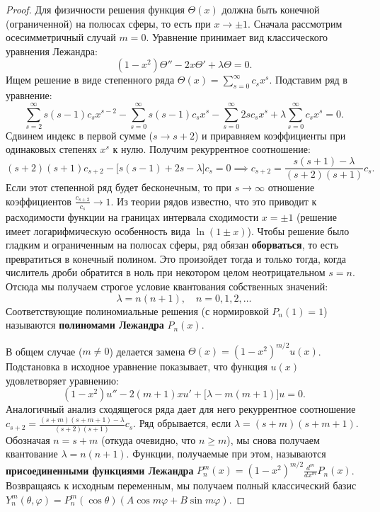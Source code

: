 \documentclass[a4paper,10pt]{article}
\begin{document}
\begin{proof}
Для физичности решения функция $\Theta(x)$ должна быть конечной (ограниченной) на полюсах сферы, то есть при $x \to \pm 1$. Сначала рассмотрим осесимметричный случай $m=0$. Уравнение принимает вид классического уравнения Лежандра:
\[ (1-x^2) \Theta'' - 2x \Theta' + \lambda \Theta = 0. \]
Ищем решение в виде степенного ряда $\Theta(x) = \sum_{s=0}^\infty c_s x^s$. Подставим ряд в уравнение:
\[ \sum_{s=2}^\infty s(s-1)c_s x^{s-2} - \sum_{s=0}^\infty s(s-1)c_s x^s - \sum_{s=0}^\infty 2s c_s x^s + \lambda \sum_{s=0}^\infty c_s x^s = 0. \]
Сдвинем индекс в первой сумме ($s \to s+2$) и приравняем коэффициенты при одинаковых степенях $x^s$ к нулю. Получим рекуррентное соотношение:
\[ (s+2)(s+1)c_{s+2} - \big[s(s-1) + 2s - \lambda\big]c_s = 0 \implies c_{s+2} = \frac{s(s+1) - \lambda}{(s+2)(s+1)} c_s. \]
Если этот степенной ряд будет бесконечным, то при $s \to \infty$ отношение коэффициентов $\frac{c_{s+2}}{c_s} \to 1$. Из теории рядов известно, что это приводит к расходимости функции на границах интервала сходимости $x = \pm 1$ (решение имеет логарифмическую особенность вида $\ln(1 \pm x)$). 
Чтобы решение было гладким и ограниченным на полюсах сферы, ряд обязан \textbf{оборваться}, то есть превратиться в конечный полином. Это произойдет тогда и только тогда, когда числитель дроби обратится в ноль при некотором целом неотрицательном $s = n$. Отсюда мы получаем строгое условие квантования собственных значений:
\[ \lambda = n(n+1), \quad n = 0, 1, 2, \dots \]
Соответствующие полиномиальные решения (с нормировкой $P_n(1)=1$) называются \textbf{полиномами Лежандра} $P_n(x)$.

В общем случае ($m \neq 0$) делается замена $\Theta(x) = (1-x^2)^{m/2} u(x)$. Подстановка в исходное уравнение показывает, что функция $u(x)$ удовлетворяет уравнению:
\[ (1-x^2)u'' - 2(m+1)xu' + \big[ \lambda - m(m+1) \big] u = 0. \]
Аналогичный анализ сходящегося ряда дает для него рекуррентное соотношение $c_{s+2} = \frac{(s+m)(s+m+1) - \lambda}{(s+2)(s+1)} c_s$. 
Ряд обрывается, если $\lambda = (s+m)(s+m+1)$. Обозначая $n = s+m$ (откуда очевидно, что $n \ge m$), мы снова получаем квантование $\lambda = n(n+1)$.
Функции, получаемые при этом, называются \textbf{присоединенными функциями Лежандра} $P_n^m(x) = (1-x^2)^{m/2} \frac{d^m}{dx^m} P_n(x)$.
Возвращаясь к исходным переменным, мы получаем полный классический базис $Y_n^m(\theta, \varphi) = P_n^m(\cos\theta)(A\cos m\varphi + B\sin m\varphi)$.
\end{proof}
\end{document}

